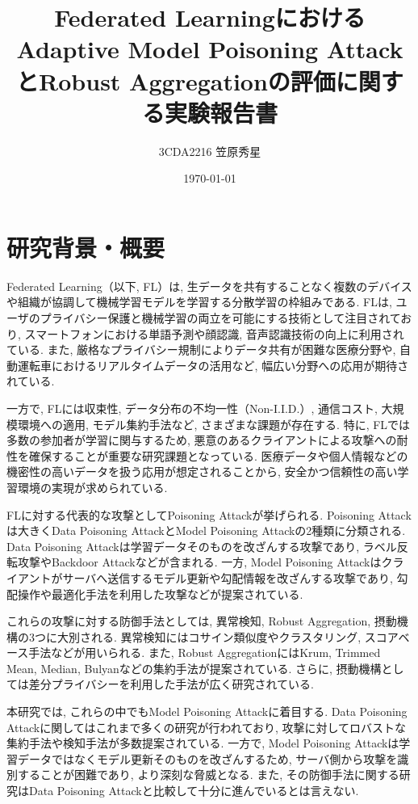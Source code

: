 \documentclass[a4j, twocolumn, dvipdfmx]{jsarticle}  %
\title{
Federated LearningにおけるAdaptive Model Poisoning AttackとRobust Aggregationの評価に関する実験報告書
}
\author{3CDA2216 笠原秀星}
\date{\today}
\begin{document}
\maketitle  %

\section{研究背景・概要}

Federated Learning（以下, FL）は, 生データを共有することなく複数のデバイスや組織が協調して機械学習モデルを学習する分散学習の枠組みである\cite{mammen2021fl}.
FLは, ユーザのプライバシー保護と機械学習の両立を可能にする技術として注目されており, スマートフォンにおける単語予測や顔認識, 音声認識技術の向上に利用されている. また, 厳格なプライバシー規制によりデータ共有が困難な医療分野や, 自動運転車におけるリアルタイムデータの活用など, 幅広い分野への応用が期待されている\cite{li2019fl}.

一方で, FLには収束性, データ分布の不均一性（Non-I.I.D.）, 通信コスト, 大規模環境への適用, モデル集約手法など, さまざまな課題が存在する\cite{ma2020privacy}. 特に, FLでは多数の参加者が学習に関与するため, 悪意のあるクライアントによる攻撃への耐性を確保することが重要な研究課題となっている. 医療データや個人情報などの機密性の高いデータを扱う応用が想定されることから, 安全かつ信頼性の高い学習環境の実現が求められている.

FLに対する代表的な攻撃としてPoisoning Attackが挙げられる. Poisoning Attackは大きくData Poisoning AttackとModel Poisoning Attackの2種類に分類される. Data Poisoning Attackは学習データそのものを改ざんする攻撃であり, ラベル反転攻撃やBackdoor Attackなどが含まれる. 一方, Model Poisoning Attackはクライアントがサーバへ送信するモデル更新や勾配情報を改ざんする攻撃であり, 勾配操作や最適化手法を利用した攻撃などが提案されている.

これらの攻撃に対する防御手法としては, 異常検知, Robust Aggregation, 摂動機構の3つに大別される. 異常検知にはコサイン類似度やクラスタリング, スコアベース手法などが用いられる. また, Robust AggregationにはKrum, Trimmed Mean, Median, Bulyanなどの集約手法が提案されている. さらに, 摂動機構としては差分プライバシーを利用した手法が広く研究されている\cite{sagar2023survey}.

本研究では, これらの中でもModel Poisoning Attackに着目する. Data Poisoning Attackに関してはこれまで多くの研究が行われており, 攻撃に対してロバストな集約手法や検知手法が多数提案されている. 一方で, Model Poisoning Attackは学習データではなくモデル更新そのものを改ざんするため, サーバ側から攻撃を識別することが困難であり, より深刻な脅威となる. また, その防御手法に関する研究はData Poisoning Attackと比較して十分に進んでいるとは言えない.
\end{document}
